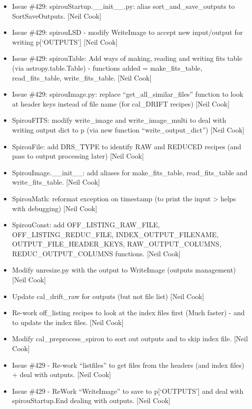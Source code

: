 \documentclass[a4paper,10pt,english]{report}
\begin{document}
\begin{itemize}
\item {} 
Issue \#429: spirouStartup.\_\_init\_\_.py: alias sort\_and\_save\_outputs to
SortSaveOutputs. {[}Neil Cook{]}

\item {} 
Issue \#429: spirouLSD - modify WriteImage to accept new input/output
for writing p{[}‘OUTPUTS’{]} {[}Neil Cook{]}

\item {} 
Issue \#429: spirouTable: Add ways of making, reading and writing fits
table (via astropy.table.Table) - functions added = make\_fits\_table,
read\_fits\_table, write\_fits\_table. {[}Neil Cook{]}

\item {} 
Issue \#429: spirouImage.py: replace “get\_all\_similar\_files” function
to look at header keys instead of file name (for cal\_DRIFT recipes)
{[}Neil Cook{]}

\item {} 
SpirouFITS: modify write\_image and write\_image\_multi to deal with
writing output dict to p (via new function “write\_output\_dict”) {[}Neil
Cook{]}

\item {} 
SpirouFile: add DRS\_TYPE to identify RAW and REDUCED recipes (and pass
to output processing later) {[}Neil Cook{]}

\item {} 
SpirouImage.\_\_init\_\_: add aliases for make\_fits\_table, read\_fits\_table
and write\_fits\_table. {[}Neil Cook{]}

\item {} 
SpirouMath: reformat exception on timestamp (to print the input \textendash{}\textgreater{}
helps with debugging) {[}Neil Cook{]}

\item {} 
SpirouConst: add OFF\_LISTING\_RAW\_FILE, OFF\_LISTING\_REDUC\_FILE,
INDEX\_OUTPUT\_FILENAME, OUTPUT\_FILE\_HEADER\_KEYS, RAW\_OUTPUT\_COLUMNS,
REDUC\_OUTPUT\_COLUMNS functions. {[}Neil Cook{]}

\item {} 
Modify unresize.py with the output to WriteImage (outputs management)
{[}Neil Cook{]}

\item {} 
Update cal\_drift\_raw for outputs (but not file list) {[}Neil Cook{]}

\item {} 
Re-work off\_listing recipes to look at the index files first (Much
faster) - and to update the index files. {[}Neil Cook{]}

\item {} 
Modify cal\_preprocess\_spirou to sort out outputs and to skip index
file. {[}Neil Cook{]}

\item {} 
Issue \#429 - Re-work “listfiles” to get files from the headers (and
index files) + deal with outputs. {[}Neil Cook{]}

\item {} 
Issue \#429 - ReWork “WriteImage” to save to p{[}‘OUTPUTS’{]} and deal with
spirouStartup.End dealing with outputs. {[}Neil Cook{]}

\end{itemize}
\end{document}
